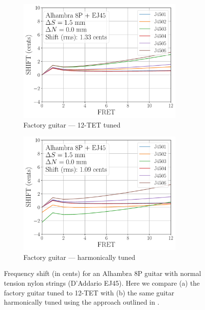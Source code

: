 
 \begin{figure}
  \centering
  \begin{subfigure}[b]{0.45\textwidth}
   \centering
   \includegraphics[width=3.25in]{../figures/shift_alhambra8p_ej45_factory}
   \caption{Factory guitar --- 12-TET tuned}
   \label{fig:shift_alhambra8p_ej45_fact_temp}
  \end{subfigure}
  \hspace{0.25in}
  \begin{subfigure}[b]{0.45\textwidth}
   \centering
   \includegraphics[width=3.25in]{../figures/shift_alhambra8p_ej45_harmonic}
   \caption{Factory guitar --- harmonically tuned}
   \label{fig:shift_alhambra8p_ej45_harmonic}
  \end{subfigure}
  \caption{\label{fig:compensation_alhambra8p_ej45_temp} Frequency shift (in cents) for an Alhambra 8P guitar with normal tension nylon strings (D'Addario EJ45). Here we compare (a) the factory guitar tuned to 12-TET with (b) the same guitar harmonically tuned using the approach outlined in .}
 \end{figure}

